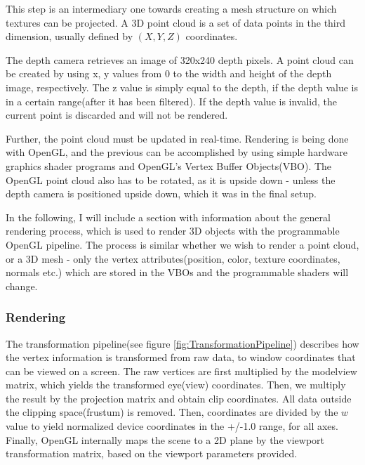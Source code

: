 \documentclass[]{article}
\begin{document}
This step is an intermediary one towards creating a mesh structure on which textures can be projected. A 3D point cloud is a set of data points in the third dimension, usually defined by $(X, Y, Z)$ coordinates.

The depth camera retrieves an image of 320x240 depth pixels. A point cloud can be created by using x, y values from 0 to the width and height of the depth image, respectively. The z value is simply equal to the depth, if the depth value is in a certain range(after it has been filtered). If the depth value is invalid, the current point is discarded and will not be rendered.

Further, the point cloud must be updated in real-time. Rendering is being done with OpenGL, and the previous can be accomplished by using simple hardware graphics shader programs and OpenGL's Vertex Buffer Objects(VBO). The OpenGL point cloud also has to be rotated, as it is upside down - unless the depth camera is positioned upside down, which it was in the final setup.

In the following, I will include a section with information about the general rendering process, which is used to render 3D objects with the programmable OpenGL pipeline. The process is similar whether we wish to render a point cloud, or a 3D mesh - only the vertex attributes(position, color, texture coordinates, normals etc.) which are stored in the VBOs and the programmable shaders will change.

\subsubsection{Rendering}

The transformation pipeline(see figure \ref{fig:TransformationPipeline}) describes how the vertex information is transformed from raw data, to window coordinates that can be viewed on a screen. The raw vertices are first multiplied by the modelview matrix, which yields the transformed eye(view) coordinates. Then, we multiply the result by the projection matrix and obtain clip coordinates. All data outside the clipping space(frustum) is removed. Then, coordinates are divided by the $w$ value to yield normalized device coordinates  in the +/-1.0 range, for all axes. Finally, OpenGL internally maps the scene to a 2D plane by the viewport transformation matrix, based on the viewport parameters provided.
\end{document}
